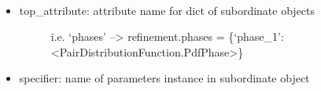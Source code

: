 \documentclass[letterpaper,10pt,english]{sphinxmanual}
\begin{document}
\begin{fulllineitems}
\begin{fulllineitems}
\end{fulllineitems}


\begin{fulllineitems}
\label{\detokenize{rst/utilities:mstack.utilities.MergeParams.upper_to_lower}}~\begin{itemize}
\item {} \begin{description}
\item[{top\_attribute: attribute name for dict of subordinate objects}] \leavevmode
i.e. `phases' --\textgreater{} refinement.phases = \{`phase\_1': \textless{}PairDistributionFunction.PdfPhase\textgreater{}\}

\end{description}

\item {} 
specifier: name of parameters instance in subordinate object

\end{itemize}

\end{fulllineitems}


\end{fulllineitems}

\end{document}
